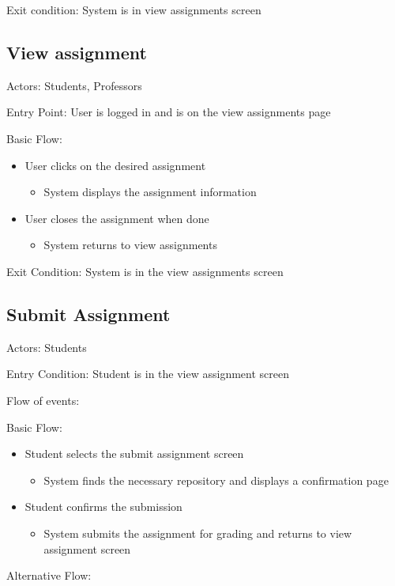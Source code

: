 Exit condition: System is in view assignments screen

\subsection*{View assignment}\label{section:h.4ha1yl1avqpu}
Actors: Students, Professors

Entry Point: User is logged in and is on the view assignments page

Basic Flow:

\begin{itemize}
\item User clicks on the desired assignment
\begin{itemize}
\item System displays the assignment information
\end{itemize}
\item User closes the assignment when done
\begin{itemize}
\item System returns to view assignments
\end{itemize}
\end{itemize}

Exit Condition: System is in the view assignments screen

\subsection*{Submit Assignment}\label{section:h.tog3atpf2tbl}
Actors: Students

Entry Condition: Student is in the view assignment screen

Flow of events:

Basic Flow:

\begin{itemize}
\item Student selects the submit assignment screen
\begin{itemize}
\item System finds the necessary repository and displays a confirmation 
page
\end{itemize}
\item Student confirms the submission
\begin{itemize}
\item System submits the assignment for grading and returns to view 
assignment screen
\end{itemize}
\end{itemize}
Alternative Flow:


